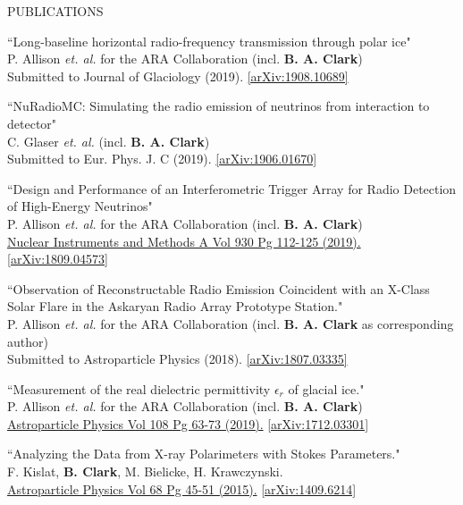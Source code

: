 \documentclass{resume} %
\begin{document}
\begin{rSection}{PUBLICATIONS}
\begin{etaremune}%
  \item ``Long-baseline horizontal radio-frequency transmission through polar ice" \\
 P. Allison {\it et. al.} for the ARA Collaboration (incl. \textbf{B. A. Clark})\\    Submitted to Journal of Glaciology (2019). \href{https://arxiv.org/abs/1908.10689}{[arXiv:1908.10689]}
  \item ``NuRadioMC: Simulating the radio emission of neutrinos from interaction to detector" \\
 C. Glaser {\it et. al.} (incl. \textbf{B. A. Clark})\\    Submitted to Eur. Phys. J. C (2019). \href{https://arxiv.org/abs/1906.01670}{[arXiv:1906.01670]}
  \item ``Design and Performance of an Interferometric Trigger Array for Radio Detection of High-Energy Neutrinos" \\
 P. Allison {\it et. al.} for the ARA Collaboration (incl. \textbf{B. A. Clark}) \\    \href{https://doi.org/10.1016/j.nima.2019.01.067}{Nuclear Instruments and Methods A Vol 930 Pg 112-125 (2019).}  \href{https://arxiv.org/abs/1809.04573}{[arXiv:1809.04573]}
 \item ``Observation of Reconstructable Radio Emission Coincident with an X-Class Solar Flare in the Askaryan Radio Array Prototype Station." \\
 P. Allison {\it et. al.} for the ARA Collaboration (incl. \textbf{B. A. Clark} as corresponding author) \\
 Submitted to Astroparticle Physics (2018). \href{https://arxiv.org/abs/1807.03335}{[arXiv:1807.03335]}
  \item ``Measurement of the real dielectric permittivity $\epsilon_r$ of glacial ice." \\
 P. Allison {\it et. al.} for the ARA Collaboration (incl. \textbf{B. A. Clark}) \\
  \href{https://doi.org/10.1016/j.astropartphys.2019.01.004}{Astroparticle Physics Vol 108 Pg 63-73 (2019).} \href{https://arxiv.org/abs/1712.03301}{[arXiv:1712.03301]} 
   \item ``Analyzing the Data from X-ray Polarimeters with Stokes Parameters." \\
 F. Kislat,  \textbf{B. Clark}, M. Bielicke, H. Krawczynski.  \\
  \href{http://dx.doi.org/10.1016/j.astropartphys.2015.02.007}{Astroparticle Physics Vol 68 Pg 45-51 (2015).} \href{https://arxiv.org/abs/1409.6214}{[arXiv:1409.6214]} 
 \end{etaremune}
\end{rSection}
\end{document}
